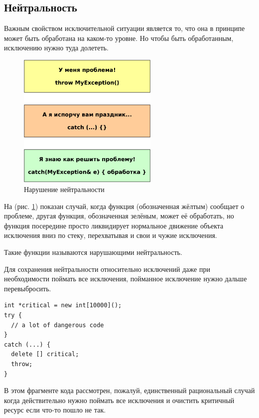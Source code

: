 \documentclass[a4paper,12pt,oneside]{book}
\begin{document}
\pagebreak
\subsection{Нейтральность}\label{subsub:neutrality}

Важным свойством исключительной ситуации является то, что она в принципе может быть обработана на каком-то уровне. Но чтобы быть обработанным, исключению нужно туда долететь.

\begin{figure}[ht]
\centering
\includegraphics[width=0.6\textwidth]{illustrations/exc-neutrality-crop.pdf}
\caption{Нарушение нейтральности}
\label{fig:exc_neutral}
\end{figure}

На (рис. \ref{fig:exc_neutral}) показан случай, когда функция (обозначенная жёлтым) сообщает о проблеме, другая функция, обозначенная зелёным, может её обработать, но функция посередине просто ликвидирует нормальное движение объекта исключения вниз по стеку, перехватывая и свои и чужие исключения.

Такие функции называются нарушающими нейтральность.

Для сохранения нейтральности относительно исключений даже при необходимости поймать все исключения, пойманное исключение нужно дальше перевыбросить.

\begin{lstlisting}
int *critical = new int[10000]();
try {
  // a lot of dangerous code
}
catch (...) {
  delete [] critical;
  throw;
}
\end{lstlisting}

В этом фрагменте кода рассмотрен, пожалуй, единственный рациональный случай когда действительно нужно поймать все исключения и очистить критичный ресурс если что-то пошло не так.
\end{document}

